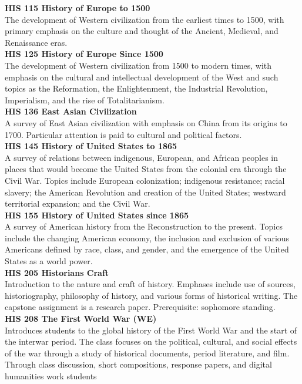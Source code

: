 \documentclass[
  letterpaper,
]{scrbook}
\begin{document}
\textbf{HIS 115 History of Europe to 1500}\\
The development of Western civilization from the earliest times to 1500,
with primary emphasis on the culture and thought of the Ancient,
Medieval, and Renaissance eras.\\
\textbf{HIS 125 History of Europe Since 1500}\\
The development of Western civilization from 1500 to modern times, with
emphasis on the cultural and intellectual development of the West and
such topics as the Reformation, the Enlightenment, the Industrial
Revolution, Imperialism, and the rise of Totalitarianism.\\
\textbf{HIS 136 East Asian Civilization}\\
A survey of East Asian civilization with emphasis on China from its
origins to 1700. Particular attention is paid to cultural and political
factors.\\
\textbf{HIS 145 History of United States to 1865}\\
A survey of relations between indigenous, European, and African peoples
in places that would become the United States from the colonial era
through the Civil War. Topics include European colonization; indigenous
resistance; racial slavery; the American Revolution and creation of the
United States; westward territorial expansion; and the Civil War.\\
\textbf{HIS 155 History of United States since 1865}\\
A survey of American history from the Reconstruction to the present.
Topics include the changing American economy, the inclusion and
exclusion of various Americans defined by race, class, and gender, and
the emergence of the United States as a world power.\\
\textbf{HIS 205 Historians Craft}\\
Introduction to the nature and craft of history. Emphases include use of
sources, historiography, philosophy of history, and various forms of
historical writing. The capstone assignment is a research paper.
Prerequisite: sophomore standing.\\
\textbf{HIS 208 The First World War (WE)}\\
Introduces students to the global history of the First World War and the
start of the interwar period. The class focuses on the political,
cultural, and social effects of the war through a study of historical
documents, period literature, and film. Through class discussion, short
compositions, response papers, and digital humanities work students
\end{document}
